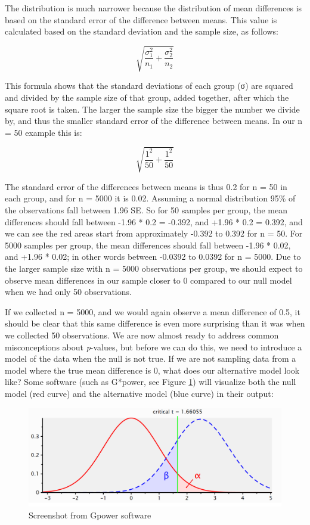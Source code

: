 \documentclass[
]{krantz}
\begin{document}
The distribution is much narrower because the distribution of mean differences is based on the standard error of the difference between means. This value is calculated based on the standard deviation and the sample size, as follows:

\[\sqrt{\frac{\sigma_{1}^{2}}{n_{1}}+\frac{\sigma_{2}^{2}}{n_{2}}}\]

This formula shows that the standard deviations of each group (σ) are squared and divided by the sample size of that group, added together, after which the square root is taken. The larger the sample size the bigger the number we divide by, and thus the smaller standard error of the difference between means. In our n = 50 example this is:

\[\sqrt{\frac{1^{2}}{50}+\frac{1^{2}}{50}}\]

The standard error of the differences between means is thus 0.2 for n = 50 in each group, and for n = 5000 it is 0.02. Assuming a normal distribution 95\% of the observations fall between 1.96 SE. So for 50 samples per group, the mean differences should fall between -1.96 * 0.2 = -0.392, and +1.96 * 0.2 = 0.392, and we can see the red areas start from approximately -0.392 to 0.392 for n = 50. For 5000 samples per group, the mean differences should fall between -1.96 * 0.02, and +1.96 * 0.02; in other words between -0.0392 to 0.0392 for n = 5000. Due to the larger sample size with n = 5000 observations per group, we should expect to observe mean differences in our sample closer to 0 compared to our null model when we had only 50 observations.

If we collected n = 5000, and we would again observe a mean difference of 0.5, it should be clear that this same difference is even more surprising than it was when we collected 50 observations. We are now almost ready to address common misconceptions about \emph{p}-values, but before we can do this, we need to introduce a model of the data when the null is not true. If we are not sampling data from a model where the true mean difference is 0, what does our alternative model look like? Some software (such as G*power, see Figure \ref{fig:gpower-screenshot}) will visualize both the null model (red curve) and the alternative model (blue curve) in their output:

\begin{figure}

{\centering \includegraphics[width=1\linewidth]{images/1.3.3} 

}

\caption{Screenshot from Gpower software}\label{fig:gpower-screenshot}
\end{figure}
\end{document}
